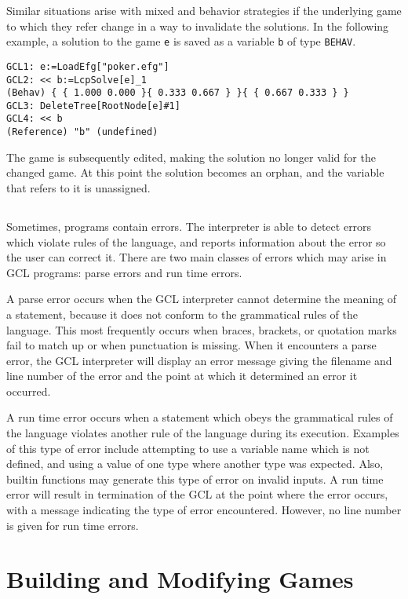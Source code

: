 Similar situations arise with mixed and behavior strategies if the
underlying game to which they refer change in a way to invalidate the
solutions.  In the following example, a solution to the game \verb+e+
is saved as a variable \verb+b+ of type \verb+BEHAV+.  

\begin{verbatim}
GCL1: e:=LoadEfg["poker.efg"]
GCL2: << b:=LcpSolve[e]_1
(Behav) { { 1.000 0.000 }{ 0.333 0.667 } }{ { 0.667 0.333 } }
GCL3: DeleteTree[RootNode[e]#1]
GCL4: << b
(Reference) "b" (undefined)
\end{verbatim}

The game is subsequently edited, making the solution no longer valid
for the changed game.  At this point the solution becomes an orphan,
and the variable that refers to it is unassigned.  

\section{}

Sometimes, programs contain errors.  The interpreter is able to detect
errors which violate rules of the language, and reports information
about the error so the user can correct it.  There are two main
classes of errors which may arise in GCL programs: parse errors and
run time errors.

A parse error occurs when the GCL interpreter cannot determine the
meaning of a statement, because it does not conform to the grammatical
rules of the language.  This most frequently occurs when braces,
brackets, or quotation marks fail to match up or when punctuation is
missing.  When it encounters a parse error, the GCL interpreter will
display an error message giving the filename and line number of the
error and the point at which it determined an error it occurred.

A run time error occurs when a statement which obeys the grammatical
rules of the language violates another rule of the language during its
execution.  Examples of this type of error include attempting to use a
variable name which is not defined, and using a value of one type
where another type was expected.  Also, builtin functions may generate
this type of error on invalid inputs.  A run time error will result in
termination of the GCL at the point where the error occurs, with a
message indicating the type of error encountered.  However, no line
number is given for run time errors.  

\chapter{Building and Modifying Games}


